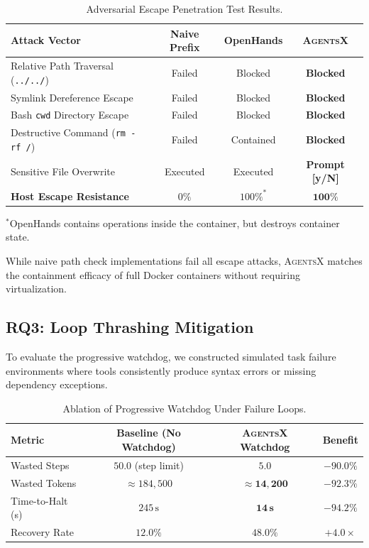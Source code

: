 \documentclass[10pt,twocolumn,letterpaper]{article}
\begin{document}
\begin{table}[htbp]
\centering
\small
\caption{Adversarial Escape Penetration Test Results.}
\label{tab:security}
\begin{tabular}{lccc}
\toprule
\textbf{Attack Vector} & \textbf{Naive Prefix} & \textbf{OpenHands} & \textbf{\textsc{AgentsX}} \\
\midrule
Relative Path Traversal (\texttt{../../}) & Failed & Blocked & \textbf{Blocked} \\
Symlink Dereference Escape & Failed & Blocked & \textbf{Blocked} \\
Bash \texttt{cwd} Directory Escape & Failed & Blocked & \textbf{Blocked} \\
Destructive Command (\texttt{rm -rf /}) & Failed & Contained & \textbf{Blocked} \\
Sensitive File Overwrite & Executed & Executed & \textbf{Prompt [y/N]} \\
\midrule
\textbf{Host Escape Resistance} & $0\%$ & $100\%^*$ & $\mathbf{100\%}$ \\
\bottomrule
\end{tabular}
\footnotesize{$^*$OpenHands contains operations inside the container, but destroys container state.}
\end{table}

While naive path check implementations fail all escape attacks, \textsc{AgentsX} matches the containment efficacy of full Docker containers without requiring virtualization.

\subsection{RQ3: Loop Thrashing Mitigation}
To evaluate the progressive watchdog, we constructed simulated task failure environments where tools consistently produce syntax errors or missing dependency exceptions.

\begin{table}[htbp]
\centering
\small
\caption{Ablation of Progressive Watchdog Under Failure Loops.}
\label{tab:watchdog}
\begin{tabular}{lccc}
\toprule
\textbf{Metric} & \textbf{Baseline (No Watchdog)} & \textbf{\textsc{AgentsX} Watchdog} & \textbf{Benefit} \\
\midrule
Wasted Steps & $50.0$ (step limit) & $\mathbf{5.0}$ & $\mathbf{-90.0\%}$ \\
Wasted Tokens & $\approx 184,500$ & $\mathbf{\approx 14,200}$ & $\mathbf{-92.3\%}$ \\
Time-to-Halt (s) & $245\,\text{s}$ & $\mathbf{14\,\text{s}}$ & $\mathbf{-94.2\%}$ \\
Recovery Rate & $12.0\%$ & $\mathbf{48.0\%}$ & $\mathbf{+4.0\times}$ \\
\bottomrule
\end{tabular}
\end{table}
\end{document}

